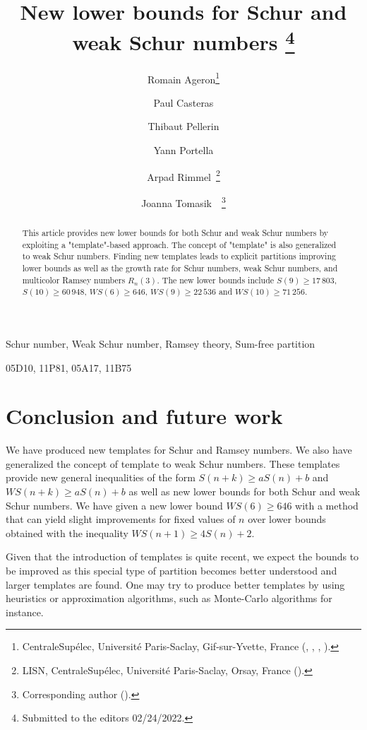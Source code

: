 \documentclass[final,onefignum,onetabnum]{siamart190516}
\title{New lower bounds for Schur and weak Schur numbers \thanks{Submitted to the editors 02/24/2022.}}
\author{Romain Ageron\thanks{CentraleSup\'elec, Universit\'e{} Paris-Saclay, Gif-sur-Yvette, France
	(\email{romain.ageron@student-cs.fr}, \email{paul.casteras@student-cs.fr},
	\email{thibaut.pellerin@student-cs.fr}, \email{yann.portella@student-cs.fr}).}
\and Paul Casteras\footnotemark[2]
\and Thibaut Pellerin\footnotemark[2]
\and Yann Portella\footnotemark[2]
\and Arpad Rimmel\footnotemark[2]\ \thanks{LISN, CentraleSup\'elec, Universit\'e{} Paris-Saclay, Orsay, France
	(\email{arpad.rimmel@centralesupelec.fr}).}
\and Joanna Tomasik\footnotemark[2]\ \footnotemark[3]\ \thanks{Corresponding author
	(\email{joanna.tomasik@centralesupelec.fr}).}}
\newcommand{\WS}{\mathit{WS}}
\begin{document}
\maketitle

\begin{abstract}
This article provides new lower bounds for both Schur and weak Schur numbers by exploiting a "template"-based approach. 
The concept of "template" is also generalized to weak Schur numbers. Finding new templates leads to explicit partitions 
improving lower bounds as well as the growth rate for Schur numbers, weak Schur numbers, and multicolor Ramsey numbers \(R_n(3)\). 
The new lower bounds include \(S(9) \geqslant 17\,803\), \(S(10) \geqslant 60\,948\), \(\WS(6) \geqslant 646\), 
\(\WS (9) \geqslant 22\,536\) and \(\WS (10) \geqslant 71\,256 \).
\end{abstract}

\begin{keywords}
	Schur number, Weak Schur number, Ramsey theory, Sum-free partition
\end{keywords}

\begin{AMS}
	05D10, 11P81, 05A17, 11B75
\end{AMS}







\section{Conclusion and future work}

We have produced new templates for Schur and Ramsey numbers. We also have generalized the concept of template to weak Schur numbers. 
These templates provide new general inequalities of the form \(S(n+k) \geqslant a S(n) + b\) and \(\WS(n+k) \geqslant a S(n) + b\) 
as well as new lower bounds for both Schur and weak Schur numbers. We have given a new lower bound \(\WS(6) \geqslant 646\) with 
a method that can yield slight improvements for fixed values of \(n\) over lower bounds obtained with the inequality 
\(\WS(n+1) \geqslant 4 S(n) + 2\).

Given that the introduction of templates is quite recent, we expect the bounds to be improved as this special type of partition 
becomes better understood and larger templates are found. One may try to produce better templates by using heuristics or 
approximation algorithms, such as Monte-Carlo algorithms for instance.
\end{document}
